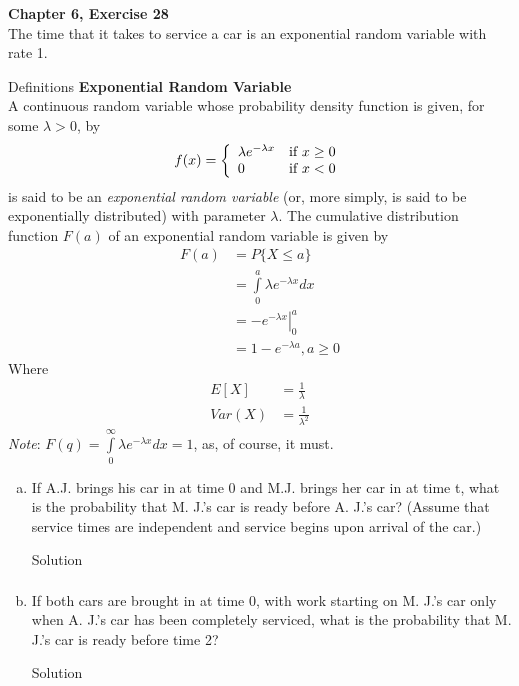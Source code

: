 \documentclass{article}
\begin{document}
\begin{spacing}{1.1}
\newpage
\begin{homeworkProblem}
  {\bf Chapter 6, Exercise 28}\\
  The time that it takes to service a car is an exponential 
  random variable with rate 1.
  \begin{homeworkSection}{Definitions}
    {\bf Exponential Random Variable}\\
    A continuous random variable whose probability density 
    function is given, for some $\lambda > 0$, by
      \[
        f(x) = \left\{
          \begin{array}{l l}
            \lambda e^{-\lambda x} &\text{if } x \ge 0\\
            0 &\text{if } x < 0
          \end{array} \right.
      \]
    is said to be an \emph{exponential random variable} (or, more simply, 
    is said to be exponentially distributed) with parameter $\lambda$. 
    The cumulative distribution function $F( a)$ of an exponential 
    random variable is given by
      \begin{align*}
        F(a) &= P\{ X \le a \}\\
        &= \int\limits_0^a \lambda e^{-\lambda x} dx\\
        &= \left.-e^{-\lambda x}\right|_0^a\\
        &= 1 - e^{-\lambda a},  a \ge 0
      \end{align*}
    Where
      \begin{align*}
        E[ X] &= \frac{ 1}{ \lambda}\\
        Var( X) &= \frac{ 1}{ \lambda^2}
      \end{align*}
    \emph{Note}: $F(q) = \int\limits_0^\infty \lambda e^{-\lambda x} dx = 1$, 
    as, of course, it must.
  \end{homeworkSection}
  \begin{enumerate}[(a)]
    \item If A.J. brings his car in at time 0 and M.J.
    brings her car in at time t, what is the probability 
    that M. J.'s car is ready before A. J.'s car? 
    (Assume that service times are independent and service 
    begins upon arrival of the car.)
      \begin{homeworkSection}{Solution}
        \begin{align*}
        \end{align*}
      \end{homeworkSection}
    \item If both cars are brought in at time 0, with work 
    starting on M. J.'s car only when A. J.'s car has been 
    completely serviced, what is the probability that M. J.'s 
    car is ready before time 2?
      \begin{homeworkSection}{Solution}
        

\end{homeworkSection}
\end{enumerate}
\end{homeworkProblem}
\end{spacing}
\end{document}
